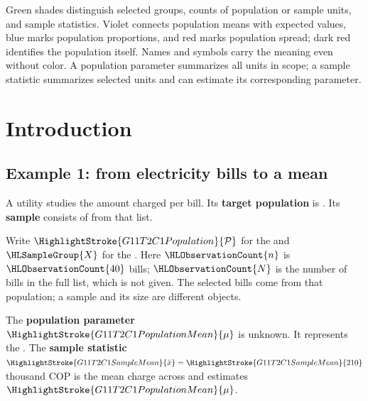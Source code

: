     Green shades distinguish selected groups, counts of population or sample units, and sample statistics. Violet connects population means with expected values, blue marks population proportions, and red marks population spread; dark red identifies the population itself. Names and symbols carry the meaning even without color. A population parameter summarizes all units in scope; a sample statistic summarizes selected units and can estimate its corresponding parameter.


	\section{Introduction}
	\label{sec:c1-introduction}


    \subsection{Example 1: from electricity bills to a mean}
	\label{subsec:c1-population-and-sample}




	{\ifGTenHighlights\raggedright\fi A utility studies the amount charged per bill. Its \textbf{target population} is  . Its \textbf{sample} consists of  from that list.\par}

    Write $\HighlightStroke{G11T2C1Population}{\mathcal{P}}$ for the  and $\HLSampleGroup{X}$ for the . Here $\HLObservationCount{n}$ is $\HLObservationCount{40}$ bills; $\HLObservationCount{N}$ is the number of bills in the full list, which is not given. The selected bills come from that population; a sample and its size are different objects.

	The \textbf{population parameter} $\HighlightStroke{G11T2C1PopulationMean}{\mu}$ is unknown. It represents the   . The \textbf{sample statistic} $\HighlightStroke{G11T2C1SampleMean}{\bar{x}}=\HighlightStroke{G11T2C1SampleMean}{210}$ thousand COP is the mean charge across  and estimates $\HighlightStroke{G11T2C1PopulationMean}{\mu}$.

